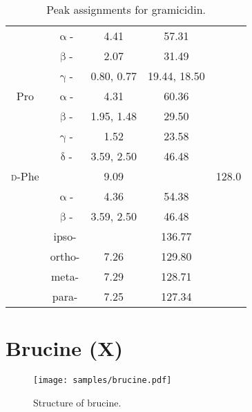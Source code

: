 \begin{table}[!ht]
\begin{tabular}{ccSSS}
                       & $\upalpha$-       & 4.41         & 57.31          &       \\
                       & $\upbeta$-        & 2.07         & 31.49          &       \\
                       & $\upgamma$-      & {0.80, 0.77} & {19.44, 18.50} &       \\
        \midrule
        Pro            & $\upalpha$-       & 4.31         & 60.36          &       \\
                       & $\upbeta$-       & {1.95, 1.48} & 29.50          &       \\
                       & $\upgamma$-      & 1.52         & 23.58          &       \\
                       & $\updelta$-      & {3.59, 2.50} & 46.48          &       \\
        \midrule
        \textsc{d}-Phe &                   & 9.09         &                & 128.0 \\
                       & $\upalpha$-       & 4.36         & 54.38          &       \\
                       & $\upbeta$-       & {3.59, 2.50} & 46.48          &       \\
                       & ipso-              &              & 136.77         &       \\
                       & ortho-            & 7.26         & 129.80         &       \\
                       & meta-             & 7.29         & 128.71         &       \\
                       & para-             & 7.25         & 127.34         &       \\
        \bottomrule
    \end{tabular}
    \caption[Peak assignments for gramicidin]{
        Peak assignments for gramicidin.
    }
    \label{tbl:gramicidin_assignments}
\end{table}

\clearpage

\section{Brucine (X)}

\begin{figure}[!ht]
    \centering
    \texttt{[image: samples/brucine.pdf]}%
    \caption[Structure of brucine]{
        Structure of brucine.
    }
    \label{fig:samples_brucine}
\end{figure}

